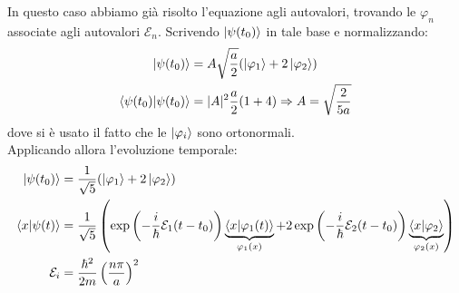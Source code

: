 \documentclass[../../FisicaTeorica.tex]{subfiles}
\begin{document}
In questo caso abbiamo già risolto l'equazione agli autovalori, trovando le $\varphi_n$ associate agli autovalori $\mathcal{E}_n$. Scrivendo $\ket{\psi(t_0)}$ in tale base e normalizzando:
\begin{align*}
\ket{\psi(t_0)} &= A\sqrt{\frac{a}{2}}(\ket{\varphi_1}+2\ket{\varphi_2})\\
\braket{\psi(t_0)|\psi(t_0)} &= |A|^2 \frac{a}{2}(1+4)\Rightarrow A=\sqrt{\frac{2}{5a}}
\end{align*}
dove si è usato il fatto che le $\ket{\varphi_i}$ sono ortonormali.\\
Applicando allora l'evoluzione temporale:
\begin{align}
\ket{\psi(t_0)} &= \frac{1}{\sqrt{5}}(\ket{\varphi_1}+2\ket{\varphi_2})\nonumber\\
\label{eqn:evoluzione_buca_t}
\braket{x|\psi(t)} &= \frac{1}{\sqrt{5}}
\left (
\exp\left(-\frac{i}{\hbar}\mathcal{E}_1(t-t_0)\right) \underbrace{\braket{x|\varphi_1(t)}}_{\varphi_1(x)} + 2\exp\left(-\frac{i}{\hbar}\mathcal{E}_2(t-t_0)\right)
\underbrace{\braket{x|\varphi_2}}_{\varphi_2(x)} \right)\\
\mathcal{E}_i &= \frac{\hbar^2}{2m}\left(\frac{n\pi}{a}\right)^2
\end{align}
\end{document}
